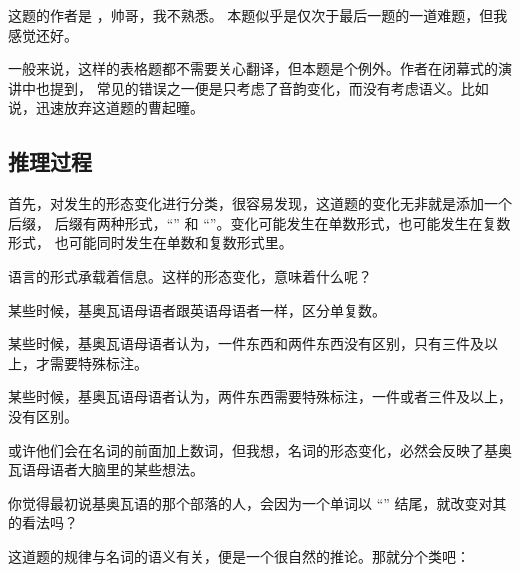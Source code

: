 这题的作者是 ，帅哥，我不熟悉。
本题似乎是仅次于最后一题的一道难题，但我感觉还好。

一般来说，这样的表格题都不需要关心翻译，但本题是个例外。作者在闭幕式的演讲中也提到，
常见的错误之一便是只考虑了音韵变化，而没有考虑语义。比如说，迅速放弃这道题的曹起曈。

\subsection{推理过程}

首先，对发生的形态变化进行分类，很容易发现，这道题的变化无非就是添加一个后缀，
后缀有两种形式，“” 和 “”。变化可能发生在单数形式，也可能发生在复数形式，
也可能同时发生在单数和复数形式里。

语言的形式承载着信息。这样的形态变化，意味着什么呢？

某些时候，基奥瓦语母语者跟英语母语者一样，区分单复数。

某些时候，基奥瓦语母语者认为，一件东西和两件东西没有区别，只有三件及以上，才需要特殊标注。

某些时候，基奥瓦语母语者认为，两件东西需要特殊标注，一件或者三件及以上，没有区别。

或许他们会在名词的前面加上数词，但我想，名词的形态变化，必然会反映了基奥瓦语母语者大脑里的某些想法。

你觉得最初说基奥瓦语的那个部落的人，会因为一个单词以 “” 结尾，就改变对其的看法吗？

这道题的规律与名词的语义有关，便是一个很自然的推论。那就分个类吧：

